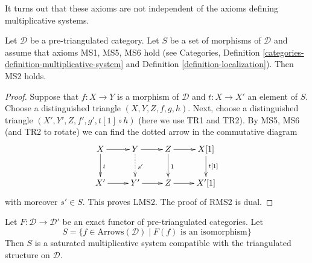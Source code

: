 \noindent
It turns out that these axioms are not independent of the
axioms defining multiplicative systems.

\begin{lemma}
\label{lemma-localization-conditions}
Let $\mathcal{D}$ be a pre-triangulated category.
Let $S$ be a set of morphisms of $\mathcal{D}$ and assume that axioms
MS1, MS5, MS6 hold (see
Categories, Definition \ref{categories-definition-multiplicative-system}
and
Definition \ref{definition-localization}).
Then MS2 holds.
\end{lemma}

\begin{proof}
Suppose that $f : X \to Y$ is a morphism of $\mathcal{D}$ and
$t : X \to X'$ an element of $S$. Choose a distinguished triangle
$(X, Y, Z, f, g, h)$. Next, choose a distinguished triangle
$(X', Y', Z, f', g', t[1] \circ h)$ (here we use TR1 and TR2).
By MS5, MS6 (and TR2 to rotate) we can find the dotted arrow
in the commutative diagram
$$
\xymatrix{
X \ar[r] \ar[d]^t &
Y \ar[r] \ar@{..>}[d]^{s'} &
Z \ar[r] \ar[d]^1 &
X[1] \ar[d]^{t[1]} \\
X' \ar[r] &
Y' \ar[r] &
Z \ar[r] &
X'[1]
}
$$
with moreover $s' \in S$. This proves LMS2. The proof of RMS2 is dual.
\end{proof}

\begin{lemma}
\label{lemma-triangle-functor-localize}
Let $F : \mathcal{D} \to \mathcal{D}'$ be an exact functor of
pre-triangulated categories.  Let
$$
S = \{f \in \text{Arrows}(\mathcal{D})
\mid F(f)\text{ is an isomorphism}\}
$$
Then $S$ is a saturated multiplicative system compatible with the
triangulated structure on $\mathcal{D}$.
\end{lemma}

